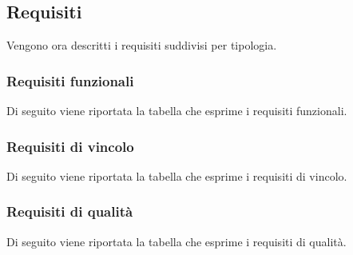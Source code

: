 \newpage
\subsection{Requisiti}
Vengono ora descritti i requisiti suddivisi per tipologia.

\subsubsection{Requisiti funzionali}
Di seguito viene riportata la tabella che esprime i requisiti funzionali.


\subsubsection{Requisiti di vincolo}
Di seguito viene riportata la tabella che esprime i requisiti di vincolo.


%

\newpage
\subsubsection{Requisiti di qualità}
Di seguito viene riportata la tabella che esprime i requisiti di qualità.
